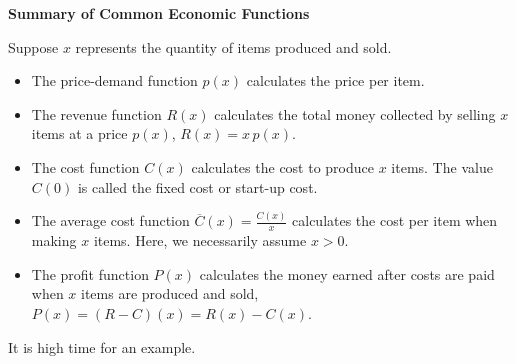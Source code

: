 \colorbox{ResultColor}{\bbm


\centerline{\textbf{Summary of Common Economic Functions}} 

\smallskip

\hspace{.17in} Suppose $x$ represents the quantity of items produced and sold.

\begin{itemize}

\item  The price-demand function $p(x)$ calculates the price per item.

\item  The revenue function $R(x)$ calculates the total money collected by selling $x$ items at a price $p(x)$,  $R(x) = x \, p(x)$.

\item  The cost function $C(x)$  calculates the cost to produce $x$ items.  The value $C(0)$ is called the fixed cost or start-up cost.

\item  The average cost function $\overline{C}(x) = \frac{C(x)}{x}$ calculates the cost per item when making $x$ items.  Here, we necessarily assume $x > 0$.

\item  The profit function $P(x)$ calculates the money earned after costs are paid when $x$ items are produced and sold, $P(x) = (R-C)(x) = R(x) - C(x)$.

\end{itemize}

\ebm}

\medskip 

It is high time for an example.


